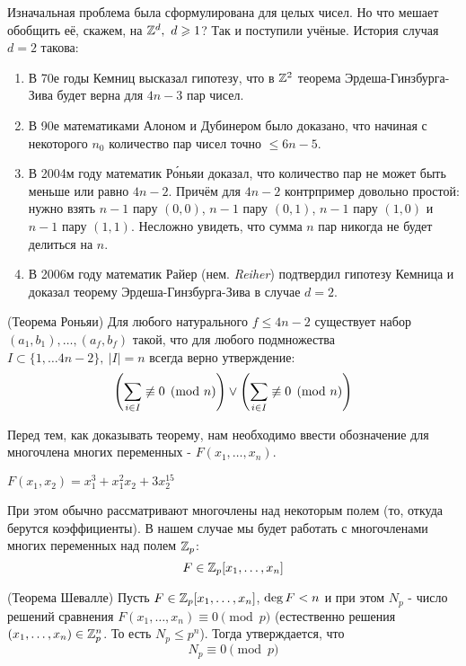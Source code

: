 Изначальная проблема была сформулирована для целых чисел. Но что мешает обобщить её, скажем, на $\mathbb{Z}^d,\ d \geqslant 1$? Так и поступили учёные. История случая $d = 2$ такова:
\begin{enumerate}
	\item В 70е годы Кемниц высказал гипотезу, что в $\mathbb{Z}^2$ теорема Эрдеша-Гинзбурга-Зива будет верна для $4n - 3$ пар чисел.
	
	\item В 90е математиками Алоном и Дубинером было доказано, что начиная с некоторого $n_0$ количество пар чисел точно $\le 6n - 5$.
	
	\item В 2004м году математик Р\'{о}ньяи доказал, что количество пар не может быть меньше или равно $4n - 2$. Причём для $4n - 2$ контрпример довольно простой: нужно взять $n - 1$ пару $(0, 0)$, $n - 1$ пару $(0, 1)$, $n - 1$ пару $(1, 0)$ и $n - 1$ пару $(1, 1)$. Несложно увидеть, что сумма $n$ пар никогда не будет делиться на $n$.
	
	\item В 2006м году математик Райер (нем. \textit{Reiher}) подтвердил гипотезу Кемница и доказал теорему Эрдеша-Гинзбурга-Зива в случае $d = 2$.
\end{enumerate}

\begin{theorem} (Теорема Роньяи)
	Для любого натурального $f \le 4n - 2$ существует набор $(a_1, b_1), \ldots, (a_f, b_f)$ такой, что для любого подмножества $I \subset \{1, \ldots 4n - 2\},\ |I| = n$ всегда верно утверждение:
	\[
		\left(\sum\limits_{i \in I} \not\equiv 0 \pmod n\right) \vee \left(\sum\limits_{i \in I} \not\equiv 0 \pmod n\right)
	\]
\end{theorem}

Перед тем, как доказывать теорему, нам необходимо ввести обозначение для многочлена многих переменных - $F(x_1, \ldots, x_n)$.
\begin{example}
	\(F(x_1, x_2) = x_1^3 + x_1^2 x_2 + 3x_2^{15}\)
\end{example}

При этом обычно рассматривают многочлены над некоторым полем (то, откуда берутся коэффициенты). В нашем случае мы будет работать с многочленами многих переменных над полем $\mathbb{Z}_p$:
\[
	F \in \mathbb{Z}_p[x_1, \ldots, x_n]
\]

\begin{theorem} (Теорема Шевалле)
	Пусть $F \in \mathbb{Z}_p[x_1, \ldots, x_n]$, $\operatorname{deg} F < n$ и при этом $N_p$ - число решений сравнения $F(x_1, \ldots, x_n) \equiv 0 \pmod p$ (естественно решения $(x_1, \ldots, x_n) \in \mathbb{Z}_p^n$. То есть $N_p \le p^n$). Тогда утверждается, что
	\[
		N_p \equiv 0 \pmod p
	\]
\end{theorem}

